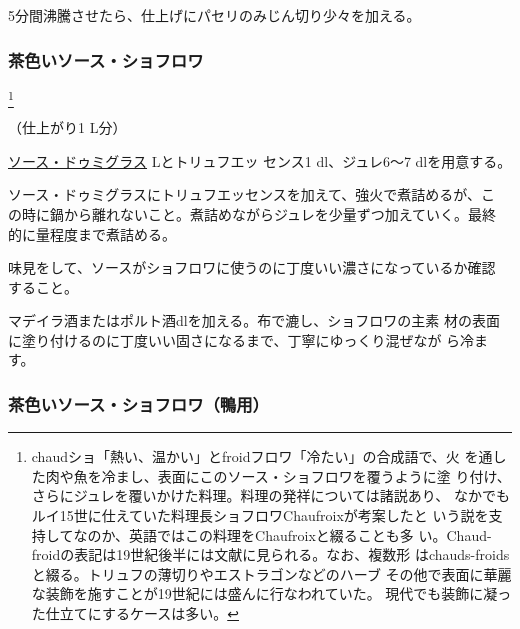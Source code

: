 \begin{recette}
5分間沸騰させたら、仕上げにパセリのみじん切り少々を加える。

\hypertarget{sauce-chaud-froid-brune}{%
\subsubsection{茶色いソース・ショフロワ}\label{sauce-chaud-froid-brune}}

\footnote{chaudショ「熱い、温かい」とfroidフロワ「冷たい」の合成語で、火
  を通した肉や魚を冷まし、表面にこのソース・ショフロワを覆うように塗
  り付け、さらにジュレを覆いかけた料理。料理の発祥については諸説あり、
  なかでもルイ15世に仕えていた料理長ショフロワChaufroixが考案したと
  いう説を支持してなのか、英語ではこの料理をChaufroixと綴ることも多
  い。Chaud-froidの表記は19世紀後半には文献に見られる。なお、複数形
  はchauds-froidsと綴る。トリュフの薄切りやエストラゴンなどのハーブ
  その他で表面に華麗な装飾を施すことが19世紀には盛んに行なわれていた。
  現代でも装飾に凝った仕立てにするケースは多い。}


（仕上がり1 L分）

\protect\hyperlink{sauce-demi-glace}{ソース・ドゥミグラス}\troisquarts{}
Lとトリュフエッ センス1 dl、ジュレ6〜7 dlを用意する。

ソース・ドゥミグラスにトリュフエッセンスを加えて、強火で煮詰めるが、こ
の時に鍋から離れないこと。煮詰めながらジュレを少量ずつ加えていく。最終
的に\deuxtiers{}量程度まで煮詰める。

味見をして、ソースがショフロワに使うのに丁度いい濃さになっているか確認
すること。

マデイラ酒またはポルト酒\undemi{}dlを加える。布で漉し、ショフロワの主素
材の表面に塗り付けるのに丁度いい固さになるまで、丁寧にゆっくり混ぜなが
ら冷ます。

\hypertarget{sauce-chaud-froid-brune-pour-canards}{%
\subsubsection{茶色いソース・ショフロワ（鴨用）}\label{sauce-chaud-froid-brune-pour-canards}}


\end{recette}
